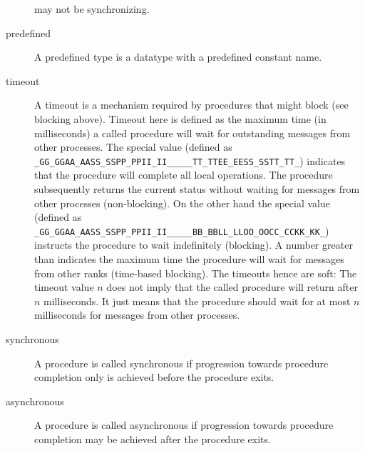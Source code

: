 \documentclass{article}
\makeatletter
\newlength{\st}\setlength{\st}{0pt}
\newcommand{\zerowsep}{\hskip 0pt plus 0.1pt minus 0.1pt}
\newcommand{\ZSEP}[1]{\ifx#1\@@@EOZ@@@\let\next\relax\else\ifx#1\_#1\zerowsep\else#1\fi\let\next\ZSEP\fi\next}
\newcommand{\zsep}[1]{\ZSEP{}#1\@@@EOZ@@@}
\newcommand{\GASPITEST}{{\tt\protect\zsep{GASPI\_TEST}}}
\newcommand{\GASPIBLOCK}{{\tt\protect\zsep{GASPI\_BLOCK}}}
\makeatother
\begin{document}
\begin{description}
  may not be synchronizing.
\item[predefined] A predefined type is a datatype with a predefined
  constant name.
\item[timeout]  A timeout is a mechanism required by procedures that
  might block (see blocking above). Timeout here is defined as the maximum
  time (in milliseconds) a called procedure will wait for outstanding messages
  from other processes. The special value   (defined as \GASPITEST{}) indicates
  that the procedure will complete all local operations. The procedure subsequently returns
  the current status without waiting for messages from other processes (non-blocking). On the other hand the
  special value  (defined as \GASPIBLOCK{}) instructs the procedure to wait indefinitely (blocking).
  A number greater than  indicates the maximum time the procedure will wait for
  messages from other ranks (time-based blocking).  The timeouts hence are soft: The timeout value $n$ does
  not imply that the called procedure will return after $n$  milliseconds. It just means that the procedure should wait for at
  most $n$ milliseconds for messages from other processes.
\item[synchronous]
  A procedure is called synchronous if progression towards procedure
  completion only is achieved before the procedure exits.
\begin{center}
\end{center}
\item[asynchronous]
  A procedure is called asynchronous if progression towards procedure
  completion may be achieved after the procedure exits.
\begin{center}
\end{center}

\end{description}
\end{document}
